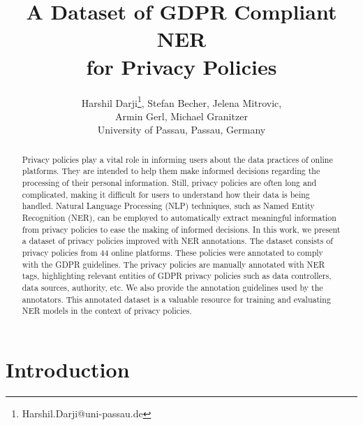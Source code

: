 \documentclass[a4paper,
               biblatex,     %
               hyphens,      %
               ]{jacow}
\begin{document}
\title{A Dataset of GDPR Compliant NER\\ for Privacy Policies}

\author{Harshil Darji\thanks{Harshil.Darji@uni-passau.de}, Stefan Becher, Jelena Mitrovic,\\
        Armin Gerl, Michael Granitzer\\
        University of Passau, Passau, Germany}
	
\maketitle

%
\begin{abstract}
   Privacy policies play a vital role in informing users about the data practices of online platforms. They are intended to help them make informed decisions regarding the processing of their personal information. Still, privacy policies are often long and complicated, making it difficult for users to understand how their data is being handled. Natural Language Processing (NLP) techniques, such as Named Entity Recognition (NER), can be employed to automatically extract meaningful information from privacy policies to ease the making of informed decisions. In this work, we present a dataset of privacy policies improved with NER annotations. The dataset consists of privacy policies from 44 online platforms. These policies were annotated to comply with the GDPR guidelines. The privacy policies are manually annotated with NER tags, highlighting relevant entities of GDPR privacy policies such as data controllers, data sources, authority, etc. We also provide the annotation guidelines used by the annotators. This annotated dataset is a valuable resource for training and evaluating NER models in the context of privacy policies.
\end{abstract}


\section{Introduction}
\end{document}
